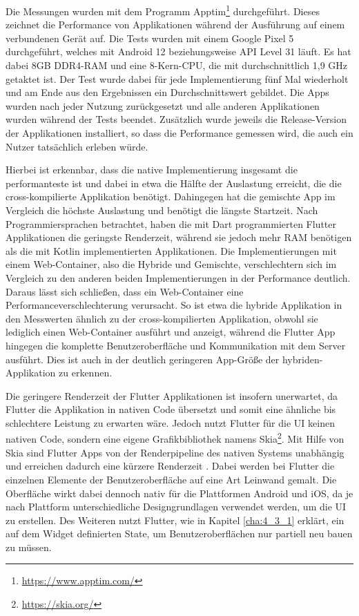 Die Messungen wurden mit dem Programm Apptim\footnote{\url{https://www.apptim.com/}} durchgeführt. Dieses zeichnet die Performance von Applikationen während der Ausführung auf einem verbundenen Gerät auf. Die Tests wurden mit einem Google Pixel 5 durchgeführt, welches mit Android 12 beziehungsweise API Level 31 läuft. Es hat dabei 8GB DDR4-RAM und eine 8-Kern-CPU, die mit durchschnittlich 1,9 GHz getaktet ist.
Der Test wurde dabei für jede Implementierung fünf Mal wiederholt und am Ende aus den Ergebnissen ein Durchschnittswert gebildet.
Die Apps wurden nach jeder Nutzung zurückgesetzt und alle anderen Applikationen wurden während der Tests beendet.
Zusätzlich wurde jeweils die Release-Version der Applikationen installiert, so dass die Performance gemessen wird, die auch ein Nutzer tatsächlich erleben würde.

Hierbei ist erkennbar, dass die native Implementierung insgesamt die performanteste ist und dabei in etwa die Hälfte der Auslastung erreicht, die die cross-kompilierte Applikation benötigt.
Dahingegen hat die gemischte App im Vergleich die höchste Auslastung und benötigt die längste Startzeit.
Nach Programmiersprachen betrachtet, haben die mit Dart programmierten Flutter Applikationen die geringste Renderzeit, während sie jedoch mehr RAM benötigen als die mit Kotlin implementierten Applikationen.
Die Implementierungen mit einem Web-Container, also die Hybride und Gemischte, verschlechtern sich im Vergleich zu den anderen beiden Implementierungen in der Performance deutlich. Daraus lässt sich schließen, dass ein Web-Container eine Performanceverschlechterung verursacht. So ist etwa die hybride Applikation in den Messwerten ähnlich zu der cross-kompilierten Applikation, obwohl sie lediglich einen Web-Container ausführt und anzeigt, während die Flutter App hingegen die komplette Benutzeroberfläche und Kommunikation mit dem Server ausführt. Dies ist auch in der deutlich geringeren App-Größe der hybriden-Applikation zu erkennen.  

Die geringere Renderzeit der Flutter Applikationen ist insofern unerwartet, da Flutter die Applikation in nativen Code übersetzt und somit eine ähnliche bis schlechtere Leistung zu erwarten wäre. Jedoch nutzt Flutter für die UI keinen nativen Code, sondern eine eigene Grafikbibliothek namens Skia\footnote{\url{https://skia.org/}}. Mit Hilfe von Skia sind Flutter Apps von der Renderpipeline des nativen Systems unabhängig und erreichen dadurch eine kürzere Renderzeit \cite{Thiele_2018}. Dabei werden bei Flutter die einzelnen Elemente der Benutzeroberfläche auf eine Art Leinwand gemalt. Die Oberfläche wirkt dabei dennoch nativ für die Plattformen Android und iOS, da je nach Plattform unterschiedliche Designgrundlagen verwendet werden, um die UI zu erstellen\cite{jose_flutter}. Des Weiteren nutzt Flutter, wie in Kapitel \ref{cha:4_3_1} erklärt, ein auf dem Widget definierten State, um Benutzeroberflächen nur partiell neu bauen zu müssen.

